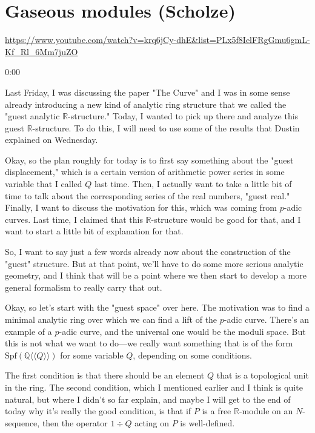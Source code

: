 
\section{\ufs Gaseous modules (Scholze)}

\url{https://www.youtube.com/watch?v=krq6jCy-dhE&list=PLx5f8IelFRgGmu6gmL-Kf_Rl_6Mm7juZO}
\renewcommand{\yt}[2]{\href{https://www.youtube.com/watch?v=krq6jCy-dhE&list=PLx5f8IelFRgGmu6gmL-Kf_Rl_6Mm7juZO&t=#1}{#2}}
\vspace{1em}

\begin{unfinished}{0:00}

Last Friday, I was discussing the paper "The Curve" and I was in some sense already introducing a new kind of analytic ring structure that we called the "guest analytic $\mathbb{R}$-structure." Today, I wanted to pick up there and analyze this guest $\mathbb{R}$-structure. To do this, I will need to use some of the results that Dustin explained on Wednesday.

Okay, so the plan roughly for today is to first say something about the "guest displacement," which is a certain version of arithmetic power series in some variable that I called $Q$ last time. Then, I actually want to take a little bit of time to talk about the corresponding series of the real numbers, "guest real." Finally, I want to discuss the motivation for this, which was coming from $p$-adic curves. Last time, I claimed that this $\mathbb{R}$-structure would be good for that, and I want to start a little bit of explanation for that.

So, I want to say just a few words already now about the construction of the "guest" structure. But at that point, we'll have to do some more serious analytic geometry, and I think that will be a point where we then start to develop a more general formalism to really carry that out.

Okay, so let's start with the "guest space" over here. The motivation was to find a minimal analytic ring over which we can find a lift of the $p$-adic curve. There's an example of a $p$-adic curve, and the universal one would be the moduli space. But this is not what we want to do---we really want something that is of the form $\text{Spf}(\mathbb{Q}\langle\!\langle Q\rangle\!\rangle)$ for some variable $Q$, depending on some conditions.

The first condition is that there should be an element $Q$ that is a topological unit in the ring. The second condition, which I mentioned earlier and I think is quite natural, but where I didn't so far explain, and maybe I will get to the end of today why it's really the good condition, is that if $P$ is a free $\mathbb{R}$-module on an $N$-sequence, then the operator $1 \div Q$ acting on $P$ is well-defined.


\end{unfinished}
